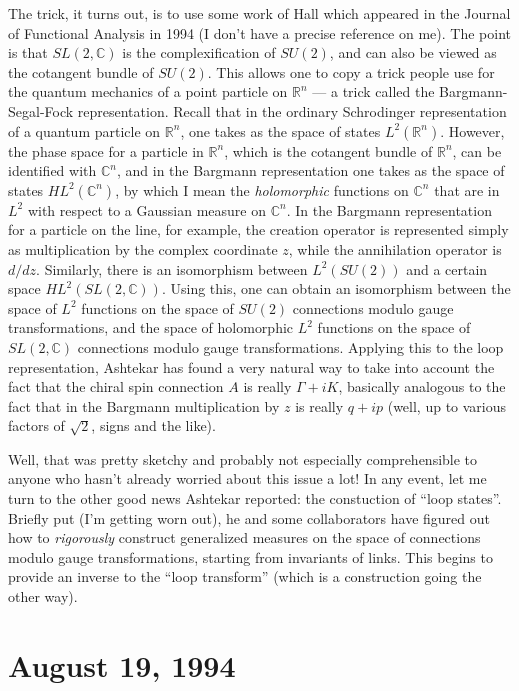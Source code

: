 \documentclass{article}
\begin{document}
The trick, it turns out, is to use some work of Hall which appeared in
the Journal of Functional Analysis in 1994 (I don't have a precise
reference on me). The point is that \(SL(2,\mathbb{C})\) is the
complexification of \(SU(2)\), and can also be viewed as the cotangent
bundle of \(SU(2)\). This allows one to copy a trick people use for the
quantum mechanics of a point particle on \(\mathbb{R}^n\) --- a trick
called the Bargmann-Segal-Fock representation. Recall that in the
ordinary Schrodinger representation of a quantum particle on
\(\mathbb{R}^n\), one takes as the space of states
\(L^2(\mathbb{R}^n)\). However, the phase space for a particle in
\(\mathbb{R}^n\), which is the cotangent bundle of \(\mathbb{R}^n\), can
be identified with \(\mathbb{C}^n\), and in the Bargmann representation
one takes as the space of states \(HL^2(\mathbb{C}^n)\), by which I mean
the \emph{holomorphic} functions on \(\mathbb{C}^n\) that are in \(L^2\)
with respect to a Gaussian measure on \(\mathbb{C}^n\). In the Bargmann
representation for a particle on the line, for example, the creation
operator is represented simply as multiplication by the complex
coordinate \(z\), while the annihilation operator is \(d/dz\).
Similarly, there is an isomorphism between \(L^2(SU(2))\) and a certain
space \(HL^2(SL(2,\mathbb{C}))\). Using this, one can obtain an
isomorphism between the space of \(L^2\) functions on the space of
\(SU(2)\) connections modulo gauge transformations, and the space of
holomorphic \(L^2\) functions on the space of \(SL(2,\mathbb{C})\)
connections modulo gauge transformations. Applying this to the loop
representation, Ashtekar has found a very natural way to take into
account the fact that the chiral spin connection \(A\) is really
\(\Gamma + iK\), basically analogous to the fact that in the Bargmann
multiplication by \(z\) is really \(q + ip\) (well, up to various
factors of \(\sqrt{2}\), signs and the like).

Well, that was pretty sketchy and probably not especially comprehensible
to anyone who hasn't already worried about this issue a lot! In any
event, let me turn to the other good news Ashtekar reported: the
constuction of ``loop states''. Briefly put (I'm getting worn out), he
and some collaborators have figured out how to \emph{rigorously}
construct generalized measures on the space of connections modulo gauge
transformations, starting from invariants of links. This begins to
provide an inverse to the ``loop transform'' (which is a construction
going the other way).
\hypertarget{week38}{%
\section{August 19, 1994}\label{week38}}
\end{document}
